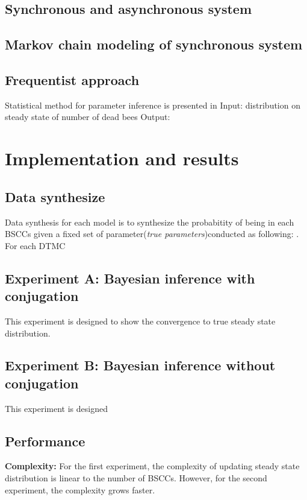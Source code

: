 \documentclass[12pt]{article}
\begin{document}
\subsection{Synchronous and asynchronous system}


\subsection{Markov chain modeling of synchronous system}

\subsection{Frequentist approach}
Statistical method for parameter inference is presented in \cite{hajnal2019data}
Input: distribution on steady state of number of dead bees Output:

\section{Implementation and results}
\subsection{Data synthesize}
Data synthesis for each model is to synthesize the probabitity of being in each
BSCCs given a fixed set of parameter(\textit{true parameters})conducted as following:
. For each DTMC


\subsection{Experiment A: Bayesian inference with conjugation}
This experiment is designed to show the convergence to true steady state
distribution. 

\subsection{Experiment B: Bayesian inference without conjugation}
This experiment is designed

\subsection{Performance}
\textbf{Complexity: } For the first experiment, the complexity of updating steady state distribution
is linear to the number of BSCCs. However, for the second experiment, the
complexity grows faster.\\
\end{document}
